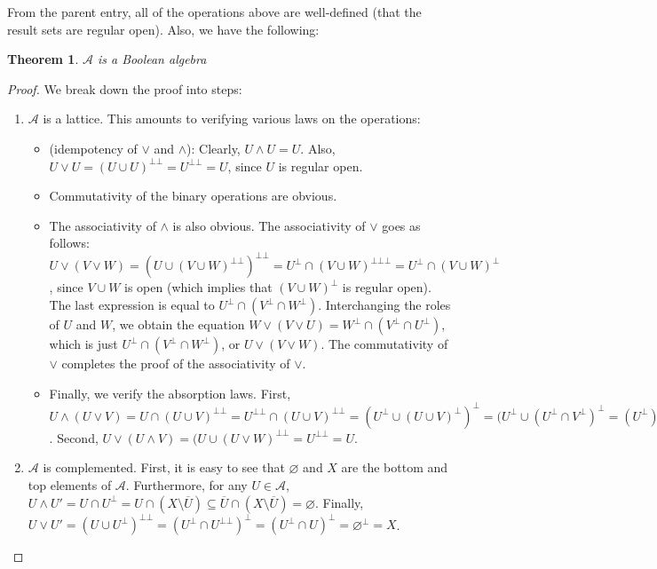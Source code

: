 \documentclass[12pt]{article}
\newtheorem{thm}{Theorem}
\begin{document}
From the parent entry, all of the operations above are well-defined (that the result sets are regular open).  Also, we have the following:
\begin{thm} $\mathcal{A}$ is a Boolean algebra \end{thm}
\begin{proof} We break down the proof into steps:
\begin{enumerate}
\item $\mathcal{A}$ is a lattice.  This amounts to verifying various laws on the operations:
\begin{itemize}
\item (idempotency of $\vee$ and $\wedge$): Clearly, $U\wedge U=U$.  Also, $U\vee U=(U\cup U)^{\bot\bot}=U^{\bot\bot}=U$, since $U$ is regular open.  
\item Commutativity of the binary operations are obvious.
\item The associativity of $\wedge$ is also obvious.  The associativity of $\vee$ goes as follows: $U\vee (V\vee W)=(U\cup (V\cup W)^{\bot\bot})^{\bot\bot} = U^\bot \cap (V\cup W)^{\bot\bot\bot} = U^\bot \cap (V\cup W)^\bot$, since $V\cup W$ is open (which implies that $(V\cup W)^\bot$ is regular open).  The last expression is equal to $U^\bot \cap (V^\bot \cap W^\bot)$.  Interchanging the roles of $U$ and $W$, we obtain the equation $W\vee (V\vee U) = W^\bot \cap (V^\bot \cap U^\bot)$, which is just $U^\bot \cap (V^\bot \cap W^\bot)$, or $U\vee (V\vee W)$.  The commutativity of $\vee$ completes the proof of the associativity of $\vee$.  
\item Finally, we verify the absorption laws.  First, $U\wedge (U\vee V)=U\cap (U\cup V)^{\bot\bot}= U^{\bot\bot}\cap (U\cup V)^{\bot\bot} = (U^\bot \cup (U\cup V)^\bot)^\bot = (U^\bot \cup (U^\bot \cap V^\bot)^\bot = (U^\bot)^\bot = U$.  Second, $U\vee (U\wedge V)=(U\cup (U\vee W)^{\bot\bot}=U^{\bot\bot}=U$.
\end{itemize}
\item $\mathcal{A}$ is complemented.  First, it is easy to see that $\varnothing$ and $X$ are the bottom and top elements of $\mathcal{A}$.  Furthermore, for any $U\in \mathcal{A}$, $U\wedge U'=U\cap U^\bot=U\cap (X\setminus \overline{U}) \subseteq \overline{U}\cap (X\setminus \overline{U})=\varnothing$.  Finally, $U\vee U'=(U\cup U^\bot)^{\bot\bot} = (U^\bot \cap U^{\bot\bot})^\bot = (U^\bot \cap U)^\bot = \varnothing^\bot=X$.

\end{enumerate}
\end{proof}
\end{document}

